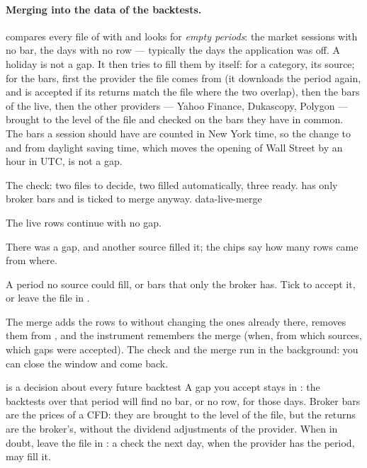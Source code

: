 \paragraph{Merging into the data of the backtests.}
 compares every file of 
with  and looks for \emph{empty periods}: the market sessions
with no bar, the days with no row --- typically the days the application was
off. A holiday is not a gap. It then tries to fill them by itself: for a
category, its source; for the bars, first the provider the file comes from
(it downloads the period again, and is accepted if its returns match the
file where the two overlap), then the bars of the live, then the other
providers --- Yahoo Finance, Dukascopy, Polygon --- brought to the level of
the file and checked on the bars they have in common. The bars a session
should have are counted in New York time, so the change to and from
daylight saving time, which moves the opening of Wall Street by an hour in
UTC, is not a gap.

  {The check: two files to decide, two filled automatically, three ready.
    has only broker bars and is ticked to merge anyway.}
  {data-live-merge}

\begin{description}[leftmargin = 1.4em, style = nextline, itemsep = 4pt]
  \item[\voce{Ready}] The live rows continue  with no gap.
  \item[\voce{Filled automatically}] There was a gap, and another source
    filled it; the chips say how many rows came from where.
  \item[\voce{Needs your decision}] A period no source could fill, or bars
    that only the broker has. Tick  to accept it, or leave
    the file in .
\end{description}

\noindent
The merge adds the rows to  without changing the ones already
there, removes them from , and the instrument remembers the
merge (when, from which sources, which gaps were accepted). The check and the
merge run in the background: you can close the window and come back.

\begin{attenzione}{ is a decision about every future backtest}
A gap you accept stays in : the backtests over that period will
find no bar, or no row, for those days. Broker bars are the
prices of a CFD: they are brought to the level of the file, but the returns
are the broker's, without the dividend adjustments of the provider. When in
doubt, leave the file in : a check the next day, when the
provider has the period, may fill it.
\end{attenzione}

